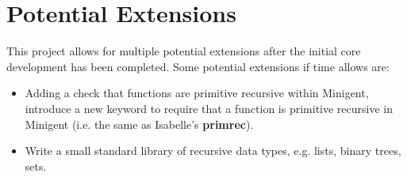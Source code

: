 \section{Potential Extensions}
\label{sec:proposedextensions}

This project allows for multiple potential extensions after the initial core development has been completed.
Some potential extensions if time allows are:

\begin{itemize}
    \item Adding a check that functions are primitive recursive within Minigent, introduce a new keyword
          to require that a function is primitive recursive in Minigent (i.e. the same as
          Isabelle's \textbf{primrec}).
    \item Write a small standard library of recursive data types, e.g. lists, binary trees, 
          sets.
\end{itemize}